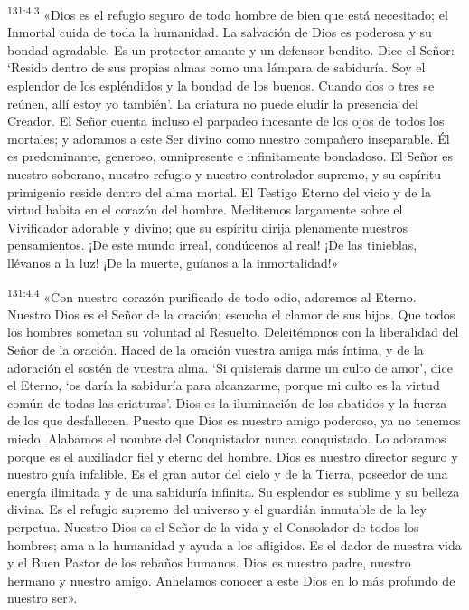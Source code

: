 \par 
\textsuperscript{131:4.3} «Dios es el refugio seguro de todo hombre de bien que está necesitado; el Inmortal cuida de toda la humanidad. La salvación de Dios es poderosa y su bondad agradable. Es un protector amante y un defensor bendito. Dice el Señor: `Resido dentro de sus propias almas como una lámpara de sabiduría. Soy el esplendor de los espléndidos y la bondad de los buenos. Cuando dos o tres se reúnen, allí estoy yo también'. La criatura no puede eludir la presencia del Creador. El Señor cuenta incluso el parpadeo incesante de los ojos de todos los mortales; y adoramos a este Ser divino como nuestro compañero inseparable. Él es predominante, generoso, omnipresente e infinitamente bondadoso. El Señor es nuestro soberano, nuestro refugio y nuestro controlador supremo, y su espíritu primigenio reside dentro del alma mortal. El Testigo Eterno del vicio y de la virtud habita en el corazón del hombre. Meditemos largamente sobre el Vivificador adorable y divino; que su espíritu dirija plenamente nuestros pensamientos. ¡De este mundo irreal, condúcenos al real! ¡De las tinieblas, llévanos a la luz! ¡De la muerte, guíanos a la inmortalidad!»

\par 
\textsuperscript{131:4.4} «Con nuestro corazón purificado de todo odio, adoremos al Eterno. Nuestro Dios es el Señor de la oración; escucha el clamor de sus hijos. Que todos los hombres sometan su voluntad al Resuelto. Deleitémonos con la liberalidad del Señor de la oración. Haced de la oración vuestra amiga más íntima, y de la adoración el sostén de vuestra alma. `Si quisierais darme un culto de amor', dice el Eterno, `os daría la sabiduría para alcanzarme, porque mi culto es la virtud común de todas las criaturas'. Dios es la iluminación de los abatidos y la fuerza de los que desfallecen. Puesto que Dios es nuestro amigo poderoso, ya no tenemos miedo. Alabamos el nombre del Conquistador nunca conquistado. Lo adoramos porque es el auxiliador fiel y eterno del hombre. Dios es nuestro director seguro y nuestro guía infalible. Es el gran autor del cielo y de la Tierra, poseedor de una energía ilimitada y de una sabiduría infinita. Su esplendor es sublime y su belleza divina. Es el refugio supremo del universo y el guardián inmutable de la ley perpetua. Nuestro Dios es el Señor de la vida y el Consolador de todos los hombres; ama a la humanidad y ayuda a los afligidos. Es el dador de nuestra vida y el Buen Pastor de los rebaños humanos. Dios es nuestro padre, nuestro hermano y nuestro amigo. Anhelamos conocer a este Dios en lo más profundo de nuestro ser».

